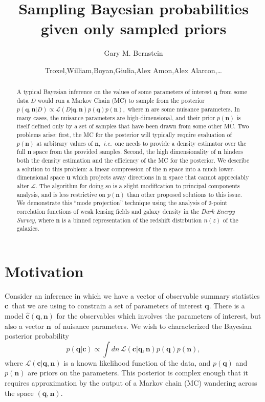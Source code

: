 \documentclass[linenumbers, onecolumn]{aastex63}
\newcommand{\ie}{\textit{i.e.}}
\newcommand{\vecc}{\ensuremath{\mathbf{c}}}
\newcommand{\vecq}{\ensuremath{\mathbf{q}}}
\newcommand{\vecn}{\ensuremath{\mathbf{n}}}
\newcommand{\vecu}{\ensuremath{\mathbf{u}}}
\newcommand{\hatc}{\ensuremath{\hat{\mathbf{c}}}}
\newcommand{\likeli}{\mathcal{L}}
\begin{document}
\title{Sampling Bayesian probabilities given only sampled priors}

\author[0000-0002-8613-8259]{Gary M. Bernstein}

\author{Troxel,William,Boyan,Giulia,Alex Amon,Alex Alarcon,\ldots}

\begin{abstract}
	\vspace{0.2in}
A typical Bayesian inference on the values of some parameters of
interest $\vecq$ from some data $D$ would run a Markov Chain (MC) to sample
from the posterior $p(\vecq,\vecn | D) \propto \likeli(D | \vecq,\vecn)
p(\vecq) p(\vecn),$ where $\vecn$ are some nuisance parameters.  In
many cases, the nuisance parameters are high-dimensional, and their
prior $p(\vecn)$ is itself defined only by a set of samples that have
been drawn from some other MC.  Two problems arise: first,
the MC for the posterior will typically require evaluation of
$p(\vecn)$ at arbitrary values of $\vecn,$ \ie\ one needs to provide a
density estimator over the full $\vecn$ space from the provided
samples.  Second, the high dimensionality of $\vecn$ hinders both the
density estimation and the efficiency of the MC for the posterior.  We
describe a solution to this problem: a linear compression of the
$\vecn$ space into a much lower-dimensional space $\vecu$ which
projects away directions in $\vecn$ space that cannot appreciably
alter $\likeli.$ The algorithm for doing so is a slight modification
to principal components analysis, and is less restrictive on
$p(\vecn)$ than other proposed solutions to this issue.
We demonstrate this ``mode projection'' technique using the analysis
of 2-point correlation functions of weak lensing fields and galaxy
density in the \textit{Dark Energy Survey}, where $\vecn$ is a binned representation of the redshift distrbution
$n(z)$ of the galaxies.
\end{abstract}
\reportnum{}

\section{Motivation} \label{sec:intro}

Consider an inference in which we have a vector of observable summary
statistics \vecc\ that we are using to constrain a set of parameters of
interest \vecq.  There is a model $\hatc(\vecq,\vecn)$ for the
observables which involves the parameters of interest, but also a
vector \vecn\ of nuisance parameters.  
We wish to characterized the Bayesian posterior probability
\begin{equation}
  p(\vecq | \vecc) \propto \int dn\, \likeli(\vecc | \vecq, \vecn) p(\vecq) p(\vecn),
\label{eq:posterior}
\end{equation}
where $\likeli(\vecc | \vecq, \vecn)$ is a known likelihood function
of the data, and $p(\vecq)$ and $p(\vecn)$ are priors on the
parameters.  This posterior is complex enough that it requires
approximation by the output of a Markov chain (MC) wandering across the space $(\vecq,\vecn).$
\end{document}
